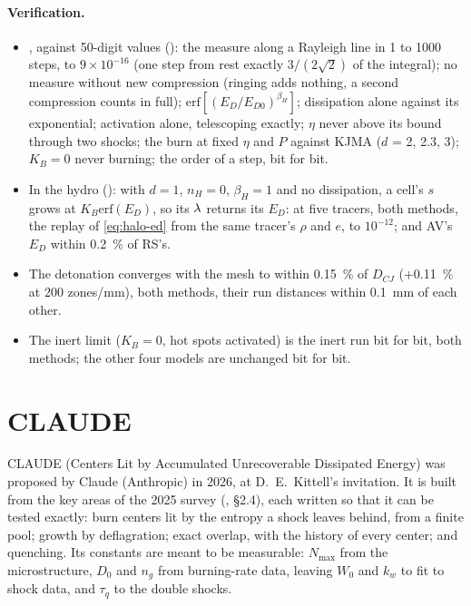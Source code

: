 \paragraph{Verification.}
\begin{itemize}
\item {}, against 50-digit values ():
  the measure along a Rayleigh line in 1 to 1000 steps, to $9\times10^{-16}$
  (one step from rest exactly $3/(2\sqrt2)$ of the integral); no measure
  without new compression (ringing adds nothing, a second compression
  counts in full); $\mathrm{erf}[(E_D/E_{D0})^{\beta_H}]$; dissipation alone
  against its exponential; activation alone, telescoping exactly; $\eta$
  never above its bound through two shocks; the burn at fixed $\eta$ and $P$
  against KJMA ($d$ = 2, 2.3, 3); $K_B = 0$ never burning; the order of a
  step, bit for bit.
\item In the hydro (): with $d = 1$,
  $n_H = 0$, $\beta_H = 1$ and no dissipation, a cell's $s$ grows at $K_B
  \mathrm{erf}(E_D)$, so its $\lambda$ returns its $E_D$: at five tracers, both
  methods, the replay of \cref{eq:halo-ed} from the same tracer's $\rho$ and
  $e$, to $10^{-12}$; and AV's $E_D$ within 0.2~\% of RS's.
\item The detonation converges with the mesh to within 0.15~\% of
  $D_{CJ}$ (+0.11~\% at 200 zones/mm), both methods, their run distances
  within 0.1~mm of each other.
\item The inert limit ($K_B = 0$, hot spots activated) is the inert run bit
  for bit, both methods; the other four models are unchanged bit for bit.
\end{itemize}

\section{CLAUDE}
\label{sec:claude}

CLAUDE (Centers Lit by Accumulated Unrecoverable Dissipated Energy) was
proposed by Claude (Anthropic) in 2026, at D.~E.~Kittell's invitation. It is
built from the key areas of the 2025 survey (\cite{kittell2025sand}, \S 2.4),
each written so that it can be tested exactly: burn centers lit by the
entropy a shock leaves behind, from a finite pool; growth by deflagration;
exact overlap, with the history of every center; and quenching. Its
constants are meant to be measurable: $N_{\max}$ from the microstructure,
$D_0$ and $n_g$ from burning-rate data, leaving $W_0$ and $k_w$ to fit to
shock data, and $\tau_q$ to the double shocks.

